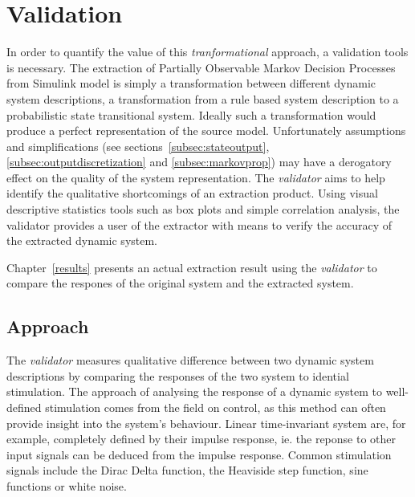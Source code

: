 \section{Validation}
\label{validation}

In order to quantify the value of this \textit{tranformational} approach, a validation tools is necessary. The extraction of Partially Observable Markov Decision Processes from Simulink model is simply a transformation between different dynamic system descriptions, a transformation from a rule based system description to a probabilistic state transitional system. Ideally such a transformation would produce a perfect representation of the source model. Unfortunately assumptions and simplifications (see sections~\ref{subsec:stateoutput}, \ref{subsec:outputdiscretization} and \ref{subsec:markovprop}) may have a derogatory effect on the quality of the system representation. The \textit{validator} aims to help identify the qualitative shortcomings of an extraction product. Using visual descriptive statistics tools such as box plots and simple correlation analysis, the validator provides a user of the extractor with means to verify the accuracy of the extracted dynamic system.

Chapter~\ref{results} presents an actual extraction result using the \textit{validator} to compare the respones of the original system and the extracted system.



\subsection{Approach}

The \textit{validator} measures qualitative difference between two dynamic system descriptions by comparing the responses of the two system to idential stimulation. The approach of analysing the response of a dynamic system to well-defined stimulation comes from the field on control, as this method can often provide insight into the system's behaviour. Linear time-invariant system are, for example, completely defined by their impulse response, ie. the reponse to other input signals can be deduced from the impulse response. Common stimulation signals include the Dirac Delta function, the Heaviside step function, sine functions or white noise.

